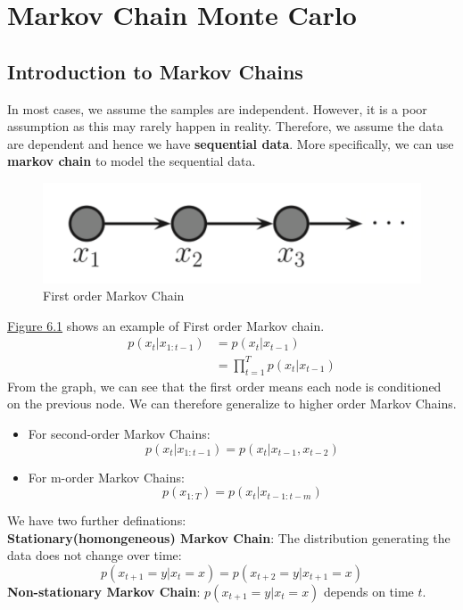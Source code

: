 \section{Markov Chain Monte Carlo}
\subsection{Introduction to Markov Chains}
In most cases, we assume the samples are independent. However, it is a poor assumption as this may rarely happen in reality. Therefore, we assume the data are dependent and hence we have \textbf{sequential data}. More specifically, we can use \textbf{markov chain} to model the sequential data.
\begin{figure}[H]
    \centering
    \includegraphics[width = .6\linewidth]{figures/section6/figure_6_1.png}
    \caption{First order Markov Chain}
    \label{fig:f_mc}
\end{figure}
\hyperref[fig:f_mc]{Figure 6.1} shows an example of First order Markov chain.
\begin{align*} 
    p\left(x_t | x_{1: t-1}\right)&=p\left(x_t | x_{t-1}\right)\\
    &=\prod_{t=1}^T p\left(x_t | x_{t-1}\right)
\end{align*}
From the graph, we can see that the first order means each node is conditioned on the previous node. We can therefore generalize to higher order Markov Chains.
\begin{itemize}    \item For second-order Markov Chains:
    $$p\left(x_t | x_{1: t-1}\right)=p\left(x_t | x_{t-1},x_{t-2}\right)$$
    \item For m-order Markov Chains:
    $$p\left(x_{1: T}\right)=p\left(x_t | x_{t-1:t-m}\right)$$
\end{itemize}
We have two further definations:\\
\textbf{Stationary(homongeneous) Markov Chain}: The distribution generating the data does not change over time:
$$p(x_{t+1}=y|x_t=x)=p(x_{t+2}=y|x_{t+1}=x)$$ 
\textbf{Non-stationary Markov Chain}: $p(x_{t+1}=y|x_t=x)$ depends on time $t$.

